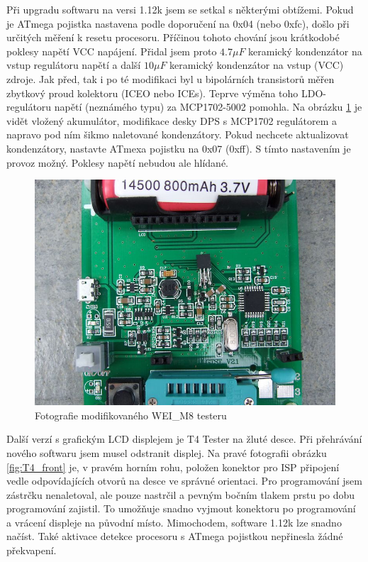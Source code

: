 Při upgradu softwaru na versi 1.12k jsem se setkal s některými obtížemi.
Pokud je ATmega pojistka nastavena podle doporučení na 0x04 (nebo 0xfc), došlo při určitých měření
k  resetu procesoru.
Příčinou tohoto chování jsou krátkodobé poklesy napětí VCC napájení.
Přidal jsem proto  \(4.7\mu F\) keramický kondenzátor na vstup regulátoru napětí
a další \(10\mu F\) keramický kondenzátor na vstup (VCC) zdroje.
Jak před, tak i po té modifikaci byl u bipolárních transistorů měřen zbytkový proud kolektoru (ICEO nebo ICEs).
Teprve výměna toho LDO-regulátoru napětí (neznámého typu) za MCP1702-5002 pomohla.
Na obrázku \ref{fig:WeiM8mod} je vidět vložený akumulátor,
modifikace desky DPS s MCP1702 regulátorem a napravo pod ním šikmo naletované kondenzátory.
Pokud nechcete aktualizovat kondenzátory, nastavte ATmexa pojistku na 0x07 (0xff).
S tímto nastavením je provoz možný.
Poklesy napětí nebudou ale hlídané.

\begin{figure}[H]
\centering
\includegraphics[width=.7\textwidth]{../PNG/WEI_M8_modified.JPG}
\caption{Fotografie modifikovaného WEI\_M8 testeru}
\label{fig:WeiM8mod}
\end{figure}

Další verzí s grafickým LCD displejem je T4 Tester na žluté desce.
Při přehrávání nového softwaru jsem musel odstranit displej.
Na pravé fotografii obrázku \ref{fig:T4_front} je, v pravém horním rohu,
 položen konektor pro ISP připojení
vedle odpovídajících otvorů na desce ve správné orientaci.
Pro programování jsem zástrčku nenaletoval, ale pouze nastrčil a pevným bočním tlakem prstu po dobu
programování zajistil.
To umožňuje snadno vyjmout konektoru po programování a vrácení displeje na původní místo.
Mimochodem, software 1.12k lze snadno načíst.
Také aktivace  detekce procesoru s ATmega pojistkou nepřinesla žádné překvapení.

